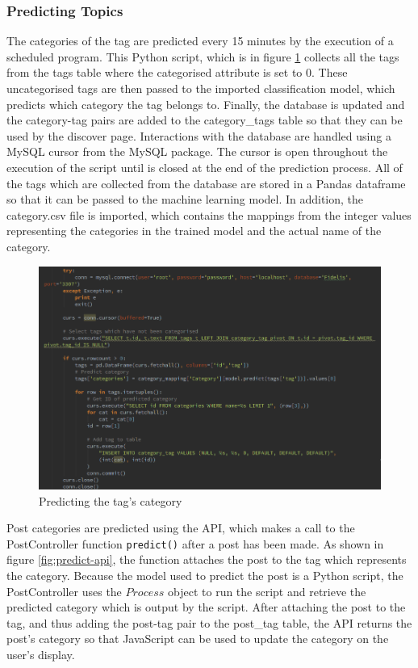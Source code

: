 \subsubsection{Predicting Topics}
The categories of the tag are predicted every 15 minutes by the execution of a scheduled program. This Python script, which is in figure \ref{fig:predict-tag} collects all the tags from the tags table where the categorised attribute is set to 0. These uncategorised tags are then passed to the imported classification model, which predicts which category the tag belongs to. Finally, the database is updated and the category-tag pairs are added to the category\_tags table so that they can be used by the discover page. Interactions with the database are handled using a MySQL cursor from the MySQL package. The cursor is open throughout the execution of the script until is closed at the end of the prediction process. All of the tags which are collected from the database are stored in a Pandas dataframe so that it can be passed to the machine learning model. In addition, the category.csv file is imported, which contains the mappings from the integer values representing the categories in the trained model and the actual name of the category.

\begin{figure}[H]
\centering
\includegraphics[width=\textwidth]{Images/Implementation/predict-tag}
\caption{Predicting the tag's category}
\label{fig:predict-tag}
\end{figure}

Post categories are predicted using the API, which makes a call to the PostController function \texttt{predict()} after a post has been made. As shown in figure \ref{fig:predict-api}, the function attaches the post to the tag which represents the category. Because the model used to predict the post is a Python script, the PostController uses the $Process$ object to run the script and retrieve the predicted category which is output by the script. After attaching the post to the tag, and thus adding the post-tag pair to the post\_tag table, the API returns the post's category so that JavaScript can be used to update the category on the user's display. 

